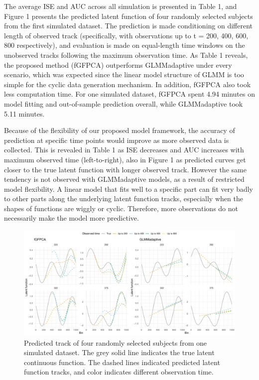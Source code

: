\documentclass[
  11pt,
]{article}
\begin{document}
The average ISE and AUC across all simulation is presented in Table 1,
and Figure 1 presents the predicted latent function of four randomly
selected subjects from the first simulated dataset. The prediction is
made conditioning on different length of observed track (specifically,
with observations up to t = 200, 400, 600, 800 respectively), and
evaluation is made on equal-length time windows on the unobserved tracks
following the maximum observation time. As Table 1 reveals, the proposed
method (fGFPCA) outperforms GLMMadaptive under every scenario, which was
expected since the linear model structure of GLMM is too simple for the
cyclic data generation mechanism. In addition, fGFPCA also took less
computation time. For one simulated dataset, fGFPCA spent 4.94 minutes
on model fitting and out-of-sample prediction overall, while
GLMMadaptive took 5.11 minutes.

Because of the flexibility of our proposed model framework, the accuracy
of prediction at specific time points would improve as more observed
data is collected. This is revealed in Table 1 as ISE decreases and AUC
increases with maximum observed time (left-to-right), also in Figure 1
as predicted curves get closer to the true latent function with longer
observed track. However the same tendency is not observed with
GLMMadaptive models, as a result of restricted model flexibility. A
linear model that fits well to a specific part can fit very badly to
other parts along the underlying latent function tracks, especially when
the shapes of functions are wiggly or cyclic. Therefore, more
observations do not necessarily make the model more predictive.

\begin{figure}
\centering
\includegraphics{Manuscript_files/figure-latex/Figure-1.pdf}
\caption{Predicted track of four randomly selected subjects from one
simulated dataset. The grey solid line indicates the true latent
continuous function. The dashed lines indicated predicted latent
function tracks, and color indicates different observation time.}
\end{figure}
\end{document}
